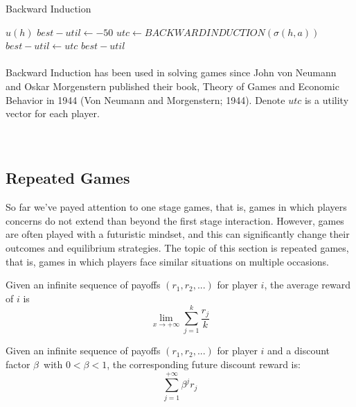 \begin{algorithm}[h!]
\caption{Backward Induction\label{fig:scaled_back}}
\begin{algorithmic}
 \STATE $u(h)$
\ENDIF
\STATE $best-util \leftarrow -50$
\STATE $utc \leftarrow BACKWARDINDUCTION(\sigma(h,a))$ 
\STATE $best-util \leftarrow utc$
\ENDIF
\ENDFOR
\RETURN $best-util$
\end{algorithmic}
\end{algorithm}
\paragraph{}Backward Induction has been used in solving games since John von Neumann and Oskar Morgenstern published their book, Theory of Games and Economic Behavior in 1944 (Von Neumann and Morgenstern; 1944). Denote $utc$ is a utility vector for each player.
\\
\\
\\

\subsection{Repeated Games}
So far we've payed attention to one stage games, that  is, games in which players concerns do not extend than beyond the first stage interaction. However, games are often played with a futuristic mindset, and this can significantly change their outcomes and equilibrium strategies. The topic of this section is repeated games, that is, games in which players face similar situations on multiple occasions.
\begin{mydef}\label{def:def666}
Given an infinite sequence of payoffs $(r_1, r_2, ...) $ for player $i$, the average reward of $i$ is
 \begin{equation}
  \lim_{x \to +\infty} \sum_{j=1}^k \frac{r_j}{k}
 \end{equation}	
\end{mydef}
\begin{mydef}\label{def:def777}
Given an infinite sequence of payoffs  $(r_1, r_2, ...) $ for player $i$ and a discount factor $\beta$\ with $ 0 < \beta < 1 $, the corresponding future discount reward is: 
 \begin{equation}\label{eq:777}
 \sum_{j=1}^{+\infty} \beta^j r_j
\end{equation}
\end{mydef}

